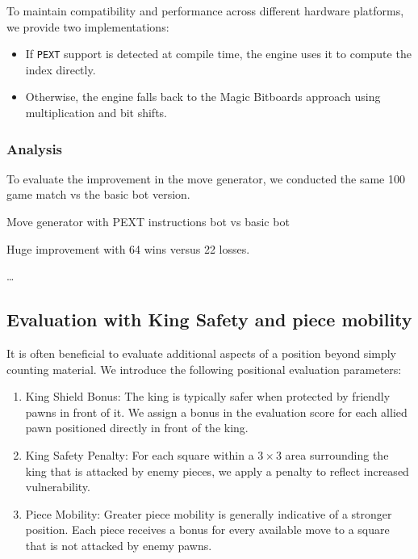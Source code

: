 \noindent To maintain compatibility and performance across different hardware platforms, we provide two implementations:

\begin{itemize}
  \item If \texttt{PEXT} support is detected at compile time, the engine uses it to compute the index directly.
  \item Otherwise, the engine falls back to the Magic Bitboards approach using multiplication and bit shifts.
\end{itemize}

\subsubsection{Analysis}

To evaluate the improvement in the move generator, we conducted the same 
100 game match vs the basic bot version.

\vspace{1em}

Move generator with PEXT instructions bot vs basic bot\\
\medskip

\vspace{1em}

Huge improvement with 64 wins versus 22 losses.

\ldots

\subsection{Evaluation with King Safety and piece mobility}

It is often beneficial to evaluate additional aspects of a position beyond simply counting material. We introduce the following positional evaluation parameters:

\begin{enumerate}
    \item King Shield Bonus: The king is typically safer when protected by friendly pawns in front of it. We assign a bonus in the evaluation score for each allied pawn positioned directly in front of the king.

    \item King Safety Penalty: For each square within a $3 \times 3$ area surrounding the king that is attacked by enemy pieces, we apply a penalty to reflect increased vulnerability.

    \item Piece Mobility: Greater piece mobility is generally indicative of a stronger position. Each piece receives a bonus for every available move to a square that is not attacked by enemy pawns.
\end{enumerate}

